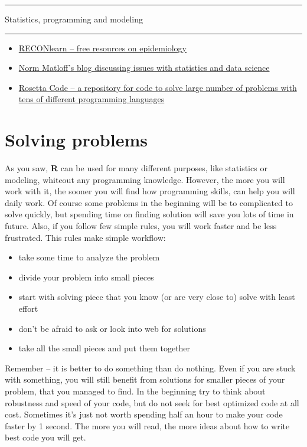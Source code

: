 \documentclass[]{book}
\providecommand{\tightlist}{%
  \setlength{\itemsep}{0pt}\setlength{\parskip}{0pt}}
\theoremstyle{definition}
\theoremstyle{definition}
\theoremstyle{definition}
\theoremstyle{remark}
\begin{document}
\begin{center}\rule{0.5\linewidth}{\linethickness}\end{center}

\begin{center}
\begingroup\Large
Statistics, programming and modeling
\endgroup
\end{center}

\begin{center}\rule{0.5\linewidth}{\linethickness}\end{center}

\begin{itemize}
\tightlist
\item
  \href{https://reconlearn.netlify.com}{RECONlearn -- free resources on
  epidemiology}
\item
  \href{https://matloff.wordpress.com/}{Norm Matloff's blog discussing
  issues with statistics and data science}
\item
  \href{https://rosettacode.org/wiki/Rosetta_Code}{Rosetta Code -- a
  repository for code to solve large number of problems with tens of
  different programming languages}
\end{itemize}

\section{Solving problems}\label{solving-problems}

As you saw, \textbf{R} can be used for many different purposes, like
statistics or modeling, whiteout any programming knowledge. However, the
more you will work with it, the sooner you will find how programming
skills, can help you will daily work. Of course some problems in the
beginning will be to complicated to solve quickly, but spending time on
finding solution will save you lots of time in future. Also, if you
follow few simple rules, you will work faster and be less frustrated.
This rules make simple workflow:

\begin{itemize}
\tightlist
\item
  take some time to analyze the problem
\item
  divide your problem into small pieces
\item
  start with solving piece that you know (or are very close to) solve
  with least effort
\item
  don't be afraid to ask or look into web for solutions
\item
  take all the small pieces and put them together
\end{itemize}

Remember -- it is better to do something than do nothing. Even if you
are stuck with something, you will still benefit from solutions for
smaller pieces of your problem, that you managed to find. In the
beginning try to think about robustness and speed of your code, but do
not seek for best optimized code at all cost. Sometimes it's just not
worth spending half an hour to make your code faster by 1 second. The
more you will read, the more ideas about how to write best code you will
get.


\end{document}
